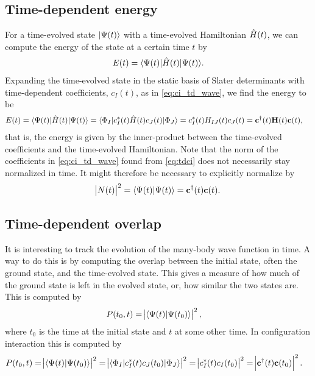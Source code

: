         \subsection{Time-dependent energy}
            For a time-evolved state $| \Psi(t) \rangle$ with a time-evolved
            Hamiltonian $\hat{H}(t)$, we can compute the energy of the state at a
            certain time $t$ by
            \begin{align}
                E(t) = \langle \Psi(t) |\hat{H}(t)| \Psi(t) \rangle.
            \end{align}
            Expanding the time-evolved state in the static basis of Slater
            determinants with time-dependent coefficients, $c_I(t)$, as in
            \autoref{eq:ci_td_wave}, we find the energy to be
            \begin{align}
                E(t)
                &= \langle \Psi(t) |\hat{H}(t)| \Psi(t) \rangle
                = \langle \Phi_I |c^{*}_I(t) \hat{H}(t) c_J(t)| \Phi_J \rangle
                = c^{*}_I(t) H_{IJ}(t) c_J(t)
                = \mathbf{c}^{\dagger}(t)\mathbf{H}(t)\mathbf{c}(t),
            \end{align}
            that is, the energy is given by the inner-product between the
            time-evolved coefficients and the time-evolved Hamiltonian.
            Note that the norm of the coefficients in \autoref{eq:ci_td_wave}
            found from \autoref{eq:tdci} does not necessarily stay normalized in
            time.
            It might therefore be necessary to explicitly normalize by
            \begin{align}
                \abs{N(t)}^2
                = \langle \Psi(t) | \Psi(t) \rangle
                = \mathbf{c}^{\dagger}(t)\mathbf{c}(t).
            \end{align}

        \subsection{Time-dependent overlap}
            It is interesting to track the evolution of the many-body wave
            function in time. A way to do this is by computing the overlap
            between the initial state, often the ground state, and the
            time-evolved state. This gives a measure of how much of the ground
            state is left in the evolved state, or, how similar the two states
            are. This is computed by
            \begin{align}
                P(t_0, t)
                &= \abs{\langle \Psi(t) | \Psi(t_0) \rangle}^2,
            \end{align}
            where $t_0$ is the time at the initial state and $t$ at some other
            time. In configuration interaction this is computed by
            \begin{align}
                P(t_0, t)
                &= \abs{\langle \Psi(t) | \Psi(t_0) \rangle}^2
                = \abs{\langle \Phi_I |c^{*}_I(t) c_J(t_0)| \Phi_J \rangle}^2
                = \abs{c^{*}_I(t)c_I(t_0)}^2
                = \abs{\mathbf{c}^{\dagger}(t)\mathbf{c}(t_0)}^2.
            \end{align}
